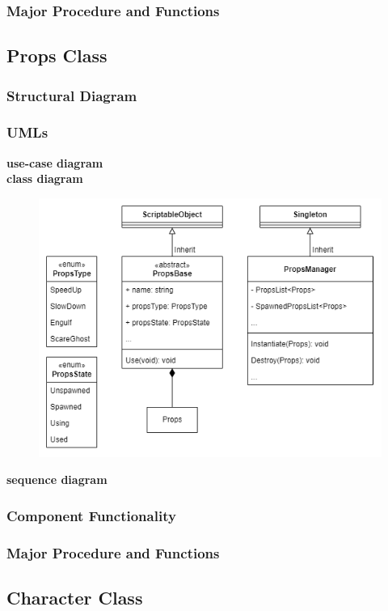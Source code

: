 \documentclass[11pt]{article}
\begin{document}
\subsubsection{Major Procedure and Functions}

\subsection{Props Class}
\subsubsection{Structural Diagram}
\subsubsection{UMLs}
\textbf{use-case diagram}\\
\textbf{class diagram}\\
\begin{figure}[H]
    \centering
    \includegraphics*[scale=0.4]{Props-Class.png}
\end{figure}
\textbf{sequence diagram}\\
\subsubsection{Component Functionality}
\subsubsection{Major Procedure and Functions}

\subsection{Character Class}
\end{document}
